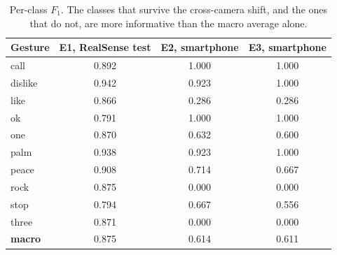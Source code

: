\begin{table}[t]
\centering
\caption{Per-class $F_1$. The classes that survive the cross-camera shift, and the ones that do not, are more informative than the macro average alone.}
\label{tab:perclass}
\begin{tabular}{lccc}
\toprule
Gesture & E1, RealSense test & E2, smartphone & E3, smartphone \\
\midrule
call & 0.892 & 1.000 & 1.000 \\
dislike & 0.942 & 0.923 & 1.000 \\
like & 0.866 & 0.286 & 0.286 \\
ok & 0.791 & 1.000 & 1.000 \\
one & 0.870 & 0.632 & 0.600 \\
palm & 0.938 & 0.923 & 1.000 \\
peace & 0.908 & 0.714 & 0.667 \\
rock & 0.875 & 0.000 & 0.000 \\
stop & 0.794 & 0.667 & 0.556 \\
three & 0.871 & 0.000 & 0.000 \\
\midrule
\textbf{macro} & 0.875 & 0.614 & 0.611 \\
\bottomrule
\end{tabular}
\end{table}
